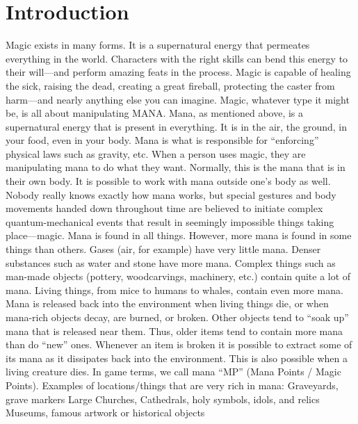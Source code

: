 \documentclass[twoside]{book}
\begin{document}
\section{Introduction}
      Magic exists in many forms. It is a supernatural
             energy that permeates everything in the world. Characters
             with the right skills can bend this energy to their
             will—and perform amazing feats in the process. Magic
             is capable of healing the sick, raising the dead, creating a
             great fireball, protecting the caster from harm—and
             nearly anything else you can imagine.   Magic, whatever type it might be, is all about
             manipulating MANA. Mana, as mentioned above, is a
             supernatural energy that is present in everything. It is in
             the air, the ground, in your food, even in your body. Mana
             is what is responsible for “enforcing” physical
             laws such as gravity, etc. When a person uses magic, they
             are manipulating mana to do what they want. Normally, this
             is the mana that is in their own body. It is possible to
             work with mana outside one’s body as well. Nobody
             really knows exactly how mana works, but special gestures
             and body movements handed down throughout time are believed
             to initiate complex quantum-mechanical events that result in
             seemingly impossible things taking place—magic.
               Mana is found in all things. However, more mana is
             found in some things than others. Gases (air, for example)
             have very little mana. Denser substances such as water and
             stone have more mana. Complex things such as man-made
             objects (pottery, woodcarvings, machinery, etc.) contain
             quite a lot of mana. Living things, from mice to humans to
             whales, contain even more mana. Mana is released back into
             the environment when living things die, or when mana-rich
             objects decay, are burned, or broken. Other objects tend to
             “soak up” mana that is released near them. Thus,
             older items tend to contain more mana than do
             “new” ones. Whenever an item is broken it is
             possible to extract some of its mana as it dissipates back
             into the environment. This is also possible when a living
             creature dies. In game terms, we call mana “MP”
             (Mana Points / Magic Points).   Examples of locations/things that are very rich in
             mana:   
              Graveyards, grave markers   
                Large Churches, Cathedrals, holy symbols, idols,
               and relics 
                Museums, famous artwork or historical objects
               
\end{document}
